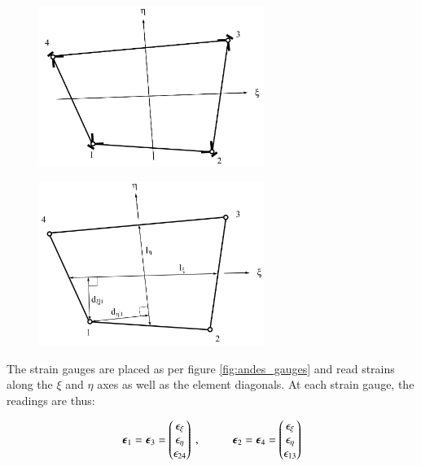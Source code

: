 \begin{figure}[H]
	\begin{minipage}{.5\textwidth}
		\centering
		\includegraphics[width=7.3cm]
		{images/ANDES_strain_gauges.png}
		\label{fig:andes_gauges}
	\end{minipage}%
	\begin{minipage}{.5\textwidth}
		\centering
		\includegraphics[width=7.3cm]
		{images/andes_geometric_quantities.png}
		\label{fig:andes_dims}
	\end{minipage}
\end{figure}

The strain gauges are placed as per figure \ref{fig:andes_gauges} and read strains along the $\xi$ and $\eta$ axes as well as the element diagonals. At each strain gauge, the readings are thus:

\begin{equation} 
\boldsymbol{\epsilon}_{1} = \boldsymbol{\epsilon}_{3} =
\begin{pmatrix}
\epsilon_\xi \\
\epsilon_\eta \\
\epsilon_{24}
\end{pmatrix}
\ ,
\hspace{10mm}
\boldsymbol{\epsilon}_{2} = \boldsymbol{\epsilon}_{4} =
\begin{pmatrix}
\epsilon_\xi \\
\epsilon_\eta \\
\epsilon_{13}
\end{pmatrix}
\label{eqnAndesStrainGauges}
\end{equation}

